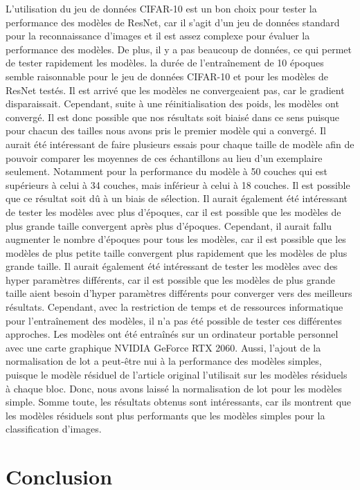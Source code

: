 \documentclass{article}
\begin{document}
L'utilisation du jeu de données CIFAR-10 est un bon choix pour tester la performance des modèles de ResNet,
car il s'agit d'un jeu de données standard pour la reconnaissance d'images et il est assez complexe pour évaluer
la performance des modèles. De plus, il y a pas beaucoup de données, ce qui permet de tester rapidement les modèles.
la durée de l'entraînement de 10 époques semble raisonnable pour le jeu de données CIFAR-10 et pour les
modèles de ResNet testés. Il est arrivé que les modèles ne convergeaient pas, car le gradient disparaissait. Cependant, suite
à une réinitialisation des poids, les modèles ont convergé. Il est donc possible que nos résultats soit biaisé dans ce sens puisque
pour chacun des tailles nous avons pris le premier modèle qui a convergé. Il aurait été intéressant de faire plusieurs essais pour
chaque taille de modèle afin de pouvoir comparer les moyennes de ces échantillons au lieu d'un exemplaire seulement. Notamment pour
la performance du modèle à 50 couches qui est supérieurs à celui à 34 couches, mais inférieur à celui à 18 couches. Il est possible
que ce résultat soit dû à un biais de sélection. Il aurait également été intéressant de tester les modèles avec plus d'époques, car
il est possible que les modèles de plus grande taille convergent après plus d'époques. Cependant, il aurait fallu augmenter le nombre
d'époques pour tous les modèles, car il est possible que les modèles de plus petite taille convergent plus rapidement que les modèles
de plus grande taille. Il aurait également été intéressant de tester les modèles avec des hyper paramètres différents, car il est possible
que les modèles de plus grande taille aient besoin d'hyper paramètres différents pour converger vers des meilleurs résultats. Cependant,
avec la restriction de temps et de ressources informatique pour l'entraînement des modèles, il n'a pas été possible de tester ces
différentes approches. Les modèles ont été entraînés sur un ordinateur portable personnel avec une carte graphique NVIDIA GeForce RTX 2060.
Aussi, l'ajout de la normalisation de lot a peut-être nui à la performance des modèles simples, puisque le modèle résiduel de l'article original
l'utilisait sur les modèles résiduels à chaque bloc. Donc, nous avons laissé la normalisation de lot pour les modèles simple.
Somme toute, les résultats obtenus sont intéressants, car ils montrent que les modèles résiduels sont plus performants que les modèles simples
pour la classification d'images.

\section{Conclusion}
\end{document}
